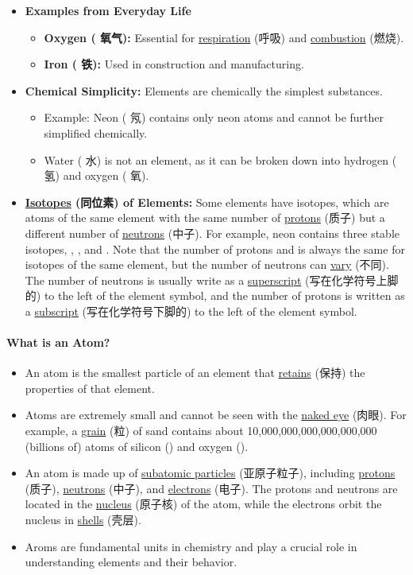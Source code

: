 \begin{itemize}
    \item \textbf{Examples from Everyday Life}
    \begin{itemize}
        \item \textbf{Oxygen ( 氧气):} Essential for \underline{respiration} (呼吸) and \underline{combustion} (燃烧).
        \item \textbf{Iron ( 铁):} Used in construction and manufacturing.
    \end{itemize}
    \item \textbf{Chemical Simplicity:} Elements are chemically the simplest substances.
    \begin{itemize}
        \item Example: Neon ( 氖) contains only neon atoms and cannot be further simplified chemically.
        \item Water ( 水) is not an element, as it can be broken down into hydrogen ( 氢) and oxygen ( 氧).
    \end{itemize}
    \item \textbf{\underline{Isotopes} (同位素) of Elements:} Some elements have isotopes, which are atoms of the same element
    with the same number of \underline{protons} (质子) but a different number of \underline{neutrons} (中子). For example, neon
    contains three stable isotopes, , , and . Note that the number of protons
    and is always the same for isotopes of the same element, but the number of neutrons can \underline{vary} (不同). The number
    of neutrons is usually write as a \underline{superscript} (写在化学符号上脚的) to the left of the element symbol, and the number
    of protons is written as a \underline{subscript} (写在化学符号下脚的) to the left of the element symbol.
\end{itemize}

\paragraph{What is an Atom?}
\begin{itemize}
    \item An atom is the smallest particle of an element that \underline{retains} (保持) the properties of that element.
    \item Atoms are extremely small and cannot be seen with the \underline{naked eye} (肉眼). For example, a \underline{grain}
    (粒) of sand contains about 10,000,000,000,000,000,000 (billions of) atoms of silicon () and oxygen ().
    \item An atom is made up of \underline{subatomic particles} (亚原子粒子), including \underline{protons} (质子),
    \underline{neutrons} (中子), and \underline{electrons} (电子). The protons and neutrons are located in the \underline{nucleus}
    (原子核) of the atom, while the electrons orbit the nucleus in \underline{shells} (壳层).
    \item Aroms are fundamental units in chemistry and play a crucial role in understanding elements and their behavior.
\end{itemize}

